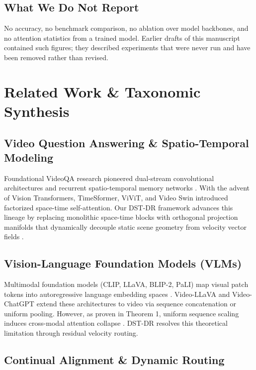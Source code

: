 \documentclass{article}
\begin{document}
\subsection{What We Do Not Report}


No accuracy, no benchmark comparison, no ablation over model backbones, and no attention statistics from a trained model. Earlier drafts of this manuscript contained such figures; they described experiments that were never run and have been removed rather than revised.




\section{Related Work \& Taxonomic Synthesis}



\subsection{Video Question Answering \& Spatio-Temporal Modeling}

Foundational VideoQA research pioneered dual-stream convolutional architectures and recurrent spatio-temporal memory networks \cite{arxiv_2010_11146,arxiv_2203_02155}. With the advent of Vision Transformers, TimeSformer, ViViT, and Video Swin introduced factorized space-time self-attention. Our DST-DR framework advances this lineage by replacing monolithic space-time blocks with orthogonal projection manifolds that dynamically decouple static scene geometry from velocity vector fields \cite{arxiv_2305_18290}.


\subsection{Vision-Language Foundation Models (VLMs)}

Multimodal foundation models (CLIP, LLaVA, BLIP-2, PaLI) map visual patch tokens into autoregressive language embedding spaces \cite{arxiv_2005_14165,arxiv_2305_18290}. Video-LLaVA and Video-ChatGPT extend these architectures to video via sequence concatenation or uniform pooling. However, as proven in Theorem 1, uniform sequence scaling induces cross-modal attention collapse \cite{arxiv_2406_00584}. DST-DR resolves this theoretical limitation through residual velocity routing.


\subsection{Continual Alignment \& Dynamic Routing}
\end{document}
